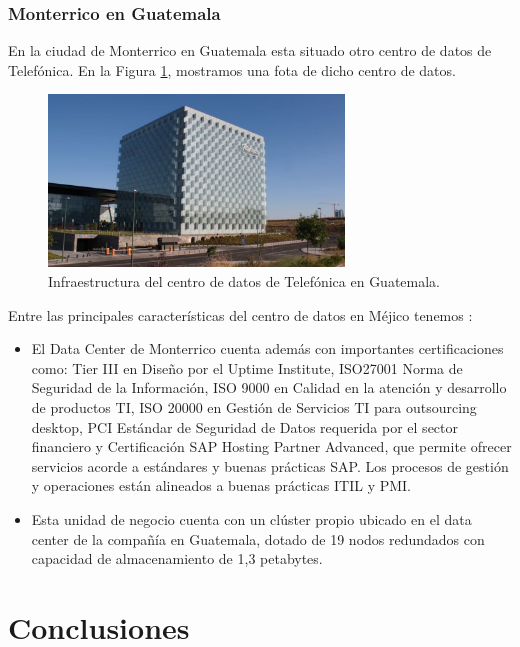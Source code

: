 \documentclass{article}
\begin{document}
\subsubsection{Monterrico en Guatemala}

En la ciudad de Monterrico en Guatemala esta situado otro centro de datos de Telefónica. En la Figura \ref{img:guatemala}, mostramos una fota de dicho centro de datos. 

\begin{figure}[H]
	\centering
	\includegraphics[width=0.7\textwidth]{img/datacenter/guatemala}	
	\caption{Infraestructura del centro de datos de Telefónica en Guatemala.}
	\label{img:guatemala}
\end{figure}

Entre las principales características del centro de datos en Méjico tenemos \citep{telefonicaguatemala}:

\begin{itemize}
	\item El Data Center de Monterrico cuenta además con importantes certificaciones como: Tier III en Diseño por el Uptime Institute, ISO27001 Norma de Seguridad de la Información, ISO 9000 en Calidad en la atención y desarrollo de productos TI, ISO 20000 en Gestión de Servicios TI para outsourcing desktop, PCI Estándar de Seguridad de Datos requerida por el sector financiero y Certificación SAP Hosting Partner Advanced, que permite ofrecer servicios acorde a estándares y buenas prácticas SAP. Los procesos de gestión y operaciones están alineados a buenas prácticas ITIL y PMI.
	\item Esta unidad de negocio cuenta con un clúster propio ubicado en el data center de la compañía en Guatemala, dotado de 19 nodos redundados con capacidad de almacenamiento de 1,3 petabytes.
	
	
\end{itemize}

\section{Conclusiones}
\end{document}
